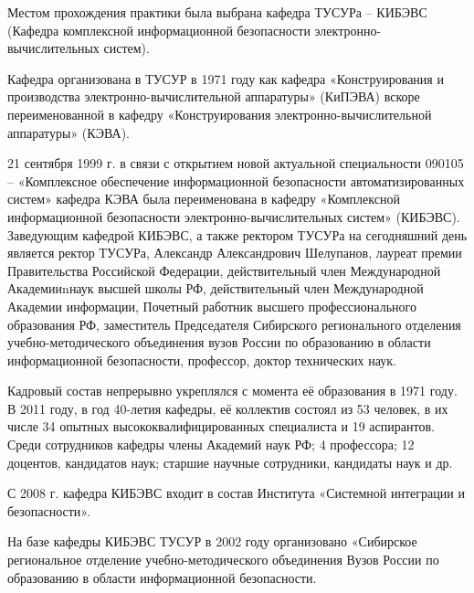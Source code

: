 Местом прохождения практики была выбрана кафедра ТУСУРа – КИБЭВС (Кафедра комплексной информационной безопасности электронно-
вычислительных систем).

Кафедра организована в ТУСУР в 1971 году как кафедра «Конструирования и производства электронно-вычислительной аппаратуры»
(КиПЭВА) вскоре переименованной в кафедру «Конструирования электронно-вычислительной аппаратуры» (КЭВА). 

21 сентября 1999 г. в связи с открытием новой актуальной специальности 090105 – «Комплексное обеспечение информационной
безопасности автоматизированных систем» кафедра КЭВА была переименована в кафедру «Комплексной информационной безопасности
электронно-вычислительных систем» (КИБЭВС). Заведующим кафедрой КИБЭВС, а также ректором ТУСУРа на сегодняшний день является ректор
ТУСУРа, Александр Александрович Шелупанов, лауреат премии Правительства Российской Федерации, действительный член 
Международной Академииnнаук высшей школы РФ, действительный член Международной Академии информации, 
Почетный работник высшего профессионального образования РФ, заместитель Председателя Сибирского регионального 
отделения учебно-методического объединения вузов России по образованию в области информационной безопасности, профессор, доктор технических наук.

Кадровый состав непрерывно укреплялся с момента её образования в 1971 году. 
В 2011 году, в год 40-летия кафедры, её коллектив состоял из 53 человек, в их числе 34 опытных 
высококвалифицированных специалиста и 19 аспирантов. Среди сотрудников кафедры  члены Академий наук РФ; 4
профессора; 12 доцентов, кандидатов наук; старшие научные сотрудники, кандидаты наук и др.

С 2008 г. кафедра КИБЭВС входит в состав Института «Системной интеграции и безопасности».

На базе кафедры КИБЭВС ТУСУР в 2002 году организовано «Сибирское региональное отделение учебно-методического объединения
Вузов России по образованию в области информационной безопасности.~\cite{kibevs}

